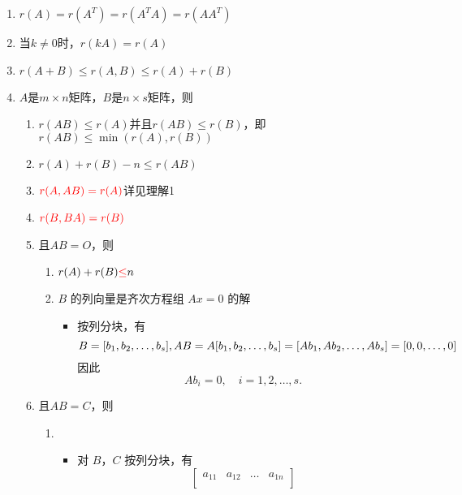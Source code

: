 \documentclass[a4paper,12pt]{article}
\begin{document}
    \begin{enumerate}
        \item $r(A) = r(A^T) = r(A^{T}A) = r(AA^{T})$
        \item 当$k \neq 0$时，$r(kA) = r(A)$
        \item $r(A + B) \le r(A, B) \le r(A) + r(B)$
        \item $A$是$m \times n$矩阵，$B$是$n \times s$矩阵，则
        \begin{enumerate}
            \item $r(AB) \le r(A) \text{并且} r(AB) \le r(B)$，即 $r(AB) \le \min(r(A), r(B))$
            \item $r(A) + r(B) - n \le r(AB)$
            \item $\color{red}{r(A, AB) = r(A)}$详见理解1
            \item $\color{red}{r(B, BA) = r(B)}$
            \item 且$AB = O$，则
            \begin{enumerate}
                \item $r(A) + r(B) {\color{red}{\le}} n$
                \item $B$ 的列向量是齐次方程组 $Ax = 0$ 的解
                \begin{itemize}
                    \item 按列分块，有
                    \[
                        B = [b_1, b_2, \dots, b_s], \\
                        AB = A[b_1, b_2, \dots, b_s] = [Ab_1, Ab_2, \dots, Ab_s] = [0, 0, \dots, 0]
                    \]
                    因此
                    \[
                        Ab_i = 0, \quad i = 1, 2, \dots, s.
                    \]
                \end{itemize}
            \end{enumerate}
            \item 且$AB = C$，则
            \begin{enumerate}
                \item {\color[rgb]{0.2, 0.6, 0.3}{矩阵$C(AB)$的行向量$\alpha_1, \alpha_2, \dots, \alpha_n$可由$B$的行向量$\beta_1, \beta_2, \dots, \beta_n$线性表出}}
                \begin{itemize}
                    \item 对 $B$，$C$ 按列分块，有
                    \[
                        \begin{bmatrix}
                            a_{11} & a_{12} & \dots & a_{1n} \\

\end{bmatrix}\]
\end{itemize}
\end{enumerate}
\end{enumerate}
\end{enumerate}
\end{document}
